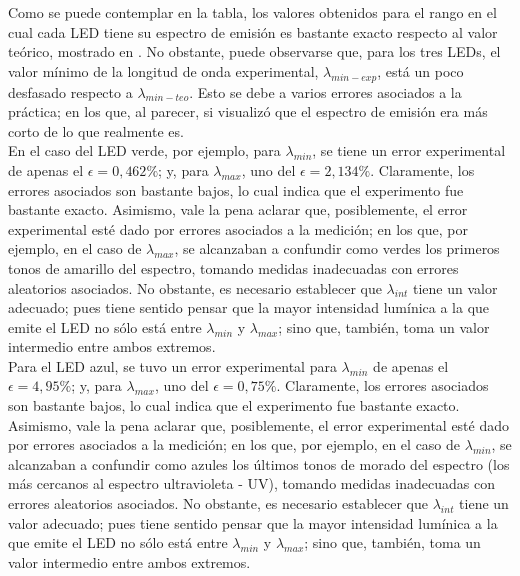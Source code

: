 \documentclass[%
 reprint,
 amsmath,amssymb,
 aps,
]{revtex4-1}
\begin{document}
Como se puede contemplar en la tabla, los valores obtenidos para el rango en el cual cada LED tiene su espectro de emisión es bastante exacto respecto al valor teórico, mostrado en \cite{LEDs_lambda}. No obstante, puede observarse que, para los tres LEDs, el valor mínimo de la longitud de onda experimental, $\lambda_{min-exp}$, está un poco desfasado respecto a  $\lambda_{min-teo}$. Esto se debe a varios errores asociados a la práctica; en los que, al parecer, si visualizó que el espectro de emisión era más corto de lo que realmente es. 
\\
En el caso del LED verde, por ejemplo, para $\lambda_{min}$, se tiene un error experimental de apenas el $\epsilon = 0,462 \%$; y, para $\lambda_{max}$, uno del $\epsilon = 2,134 \%$. Claramente, los errores asociados son bastante bajos, lo cual indica que el experimento fue bastante exacto. Asimismo, vale la pena aclarar que, posiblemente, el error experimental esté dado por errores asociados a la medición; en los que, por ejemplo, en el caso de $\lambda_{max}$, se alcanzaban a confundir como verdes los primeros tonos de amarillo del espectro, tomando medidas inadecuadas con errores aleatorios asociados. No obstante, es necesario establecer que $\lambda_{int}$ tiene un valor adecuado; pues tiene sentido pensar que la mayor intensidad lumínica a la que emite el LED no sólo está entre $\lambda_{min}$ y $\lambda_{max}$; sino que, también, toma un valor intermedio entre ambos extremos. \\
Para el LED azul, se tuvo un error experimental para  $\lambda_{min}$ de apenas el $\epsilon = 4,95 \%$; y, para $\lambda_{max}$, uno del $\epsilon = 0,75 \%$. Claramente, los errores asociados son bastante bajos, lo cual indica que el experimento fue bastante exacto. Asimismo, vale la pena aclarar que, posiblemente, el error experimental esté dado por errores asociados a la medición; en los que, por ejemplo, en el caso de $\lambda_{min}$, se alcanzaban a confundir como azules los últimos tonos de morado del espectro (los más cercanos al espectro ultravioleta - UV), tomando medidas inadecuadas con errores aleatorios asociados. No obstante, es necesario establecer que $\lambda_{int}$ tiene un valor adecuado; pues tiene sentido pensar que la mayor intensidad lumínica a la que emite el LED no sólo está entre $\lambda_{min}$ y $\lambda_{max}$; sino que, también, toma un valor intermedio entre ambos extremos. \\
\end{document}

